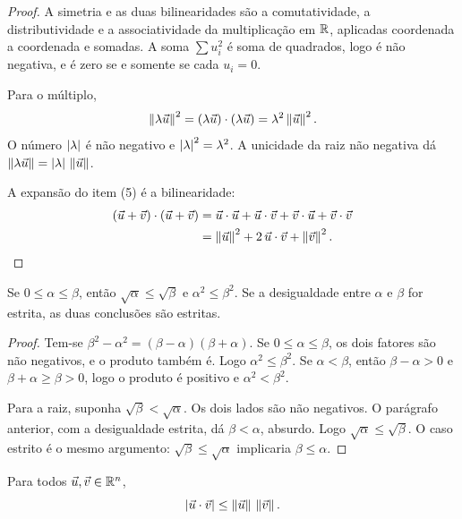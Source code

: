 \documentclass[11pt,a4paper]{article}
\begin{document}
\begin{proof}
A simetria e as duas bilinearidades são a comutatividade, a distributividade e a associatividade da multiplicação em $\mathbb{R}$, aplicadas coordenada a coordenada e somadas. A soma $\sum u_i^2$ é soma de quadrados, logo é não negativa, e é zero se e somente se cada $u_i=0$.

Para o múltiplo,
\[
\left\lVert \lambda\vec{u} \right\rVert^2=(\lambda\vec{u})\cdot(\lambda\vec{u})=\lambda^2\left\lVert \vec{u} \right\rVert^2.
\]
O número $\left\lvert \lambda \right\rvert$ é não negativo e $\left\lvert \lambda \right\rvert^2=\lambda^2$. A unicidade da raiz não negativa dá $\left\lVert \lambda\vec{u} \right\rVert=\left\lvert \lambda \right\rvert\,\left\lVert \vec{u} \right\rVert$.

A expansão do item (5) é a bilinearidade:
\begin{align*}
(\vec{u}+\vec{v})\cdot(\vec{u}+\vec{v})
&=\vec{u}\cdot\vec{u}+\vec{u}\cdot\vec{v}+\vec{v}\cdot\vec{u}+\vec{v}\cdot\vec{v}\\
&=\left\lVert \vec{u} \right\rVert^2+2\,\vec{u}\cdot\vec{v}+\left\lVert \vec{v} \right\rVert^2.
\end{align*}
\end{proof}

\begin{proposicao}\label{prop:raiz-ordem}
Se $0\le \alpha\le \beta$, então $\sqrt{\alpha}\le\sqrt{\beta}$ e $\alpha^2\le\beta^2$. Se a desigualdade entre $\alpha$ e $\beta$ for estrita, as duas conclusões são estritas.
\end{proposicao}

\begin{proof}
Tem-se $\beta^2-\alpha^2=(\beta-\alpha)(\beta+\alpha)$. Se $0\le\alpha\le\beta$, os dois fatores são não negativos, e o produto também é. Logo $\alpha^2\le\beta^2$. Se $\alpha<\beta$, então $\beta-\alpha>0$ e $\beta+\alpha\ge\beta>0$, logo o produto é positivo e $\alpha^2<\beta^2$.

Para a raiz, suponha $\sqrt{\beta}<\sqrt{\alpha}$. Os dois lados são não negativos. O parágrafo anterior, com a desigualdade estrita, dá $\beta<\alpha$, absurdo. Logo $\sqrt{\alpha}\le\sqrt{\beta}$. O caso estrito é o mesmo argumento: $\sqrt{\beta}\le\sqrt{\alpha}$ implicaria $\beta\le\alpha$.
\end{proof}

\begin{teorema}\label{teo:cs}
Para todos $\vec{u},\vec{v}\in\mathbb{R}^n$,
\[
\left\lvert \vec{u}\cdot\vec{v} \right\rvert\le\left\lVert \vec{u} \right\rVert\,\left\lVert \vec{v} \right\rVert.
\]
\end{teorema}
\end{document}
